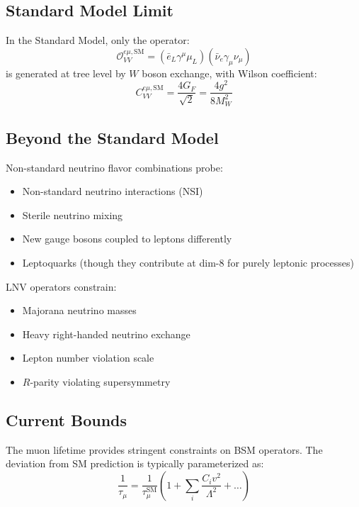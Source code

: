 \documentclass[11pt,a4paper]{article}
\begin{document}
\subsection{Standard Model Limit}

In the Standard Model, only the operator:
\begin{equation}
\mathcal{O}_{VV}^{e\mu,\text{SM}} = (\bar{e}_L \gamma^\mu \mu_L)(\bar{\nu}_e \gamma_\mu \nu_\mu)
\end{equation}
is generated at tree level by $W$ boson exchange, with Wilson coefficient:
\begin{equation}
C_{VV}^{e\mu,\text{SM}} = \frac{4G_F}{\sqrt{2}} = \frac{4g^2}{8M_W^2}
\end{equation}

\subsection{Beyond the Standard Model}

Non-standard neutrino flavor combinations probe:
\begin{itemize}
\item Non-standard neutrino interactions (NSI)
\item Sterile neutrino mixing
\item New gauge bosons coupled to leptons differently
\item Leptoquarks (though they contribute at dim-8 for purely leptonic processes)
\end{itemize}

LNV operators constrain:
\begin{itemize}
\item Majorana neutrino masses
\item Heavy right-handed neutrino exchange
\item Lepton number violation scale
\item $R$-parity violating supersymmetry
\end{itemize}

\subsection{Current Bounds}

The muon lifetime provides stringent constraints on BSM operators. The deviation from SM prediction is typically parameterized as:
\begin{equation}
\frac{1}{\tau_\mu} = \frac{1}{\tau_\mu^{\text{SM}}}\left(1 + \sum_i \frac{C_i v^2}{\Lambda^2} + \ldots\right)
\end{equation}
\end{document}
